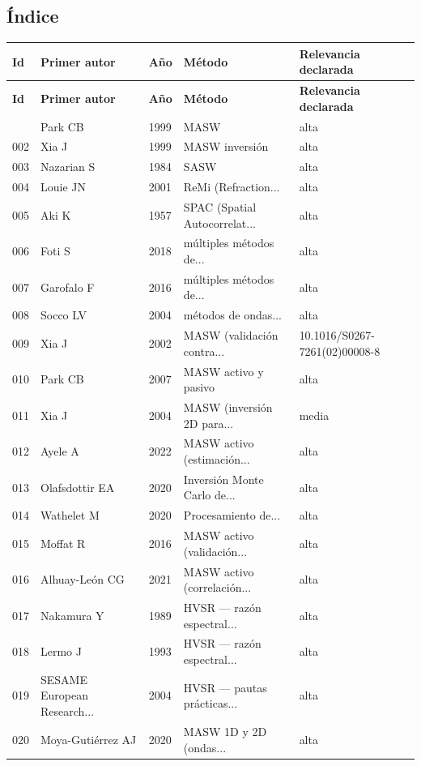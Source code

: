 \subsection{\'Indice}
\footnotesize
\begin{longtable}{@{}p{0.9cm} p{3.5cm} p{0.9cm} p{3.4cm} p{6.4cm}@{}}
\toprule \textbf{Id} & \textbf{Primer autor} & \textbf{A\~no} & \textbf{M\'etodo} & \textbf{Relevancia declarada} \\ \midrule
\endfirsthead
\toprule \textbf{Id} & \textbf{Primer autor} & \textbf{A\~no} & \textbf{M\'etodo} & \textbf{Relevancia declarada} \\ \midrule
\endhead
\bottomrule \endfoot
001 & Park CB & 1999 & MASW & alta \\
002 & Xia J & 1999 & MASW inversión & alta \\
003 & Nazarian S & 1984 & SASW & alta \\
004 & Louie JN & 2001 & ReMi (Refraction... & alta \\
005 & Aki K & 1957 & SPAC (Spatial Autocorrelat... & alta \\
006 & Foti S & 2018 & múltiples métodos de... & alta \\
007 & Garofalo F & 2016 & múltiples métodos de... & alta \\
008 & Socco LV & 2004 & métodos de ondas... & alta \\
009 & Xia J & 2002 & MASW (validación contra... & 10.1016/S0267-7261(02)00008-8 \\
010 & Park CB & 2007 & MASW activo y pasivo & alta \\
011 & Xia J & 2004 & MASW (inversión 2D para... & media \\
012 & Ayele A & 2022 & MASW activo (estimación... & alta \\
013 & Olafsdottir EA & 2020 & Inversión Monte Carlo de... & alta \\
014 & Wathelet M & 2020 & Procesamiento de... & alta \\
015 & Moffat R & 2016 & MASW activo (validación... & alta \\
016 & Alhuay-León CG & 2021 & MASW activo (correlación... & alta \\
017 & Nakamura Y & 1989 & HVSR --- razón espectral... & alta \\
018 & Lermo J & 1993 & HVSR --- razón espectral... & alta \\
019 & SESAME European Research... & 2004 & HVSR --- pautas prácticas... & alta \\
020 & Moya-Gutiérrez AJ & 2020 & MASW 1D y 2D (ondas... & alta \\

\end{longtable}
